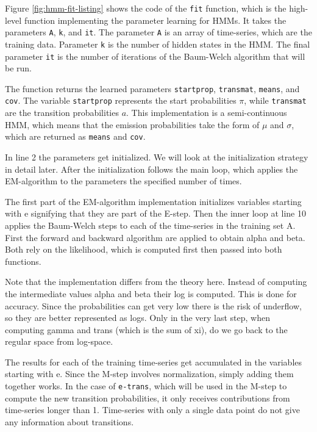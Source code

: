 Figure \ref{fig:hmm-fit-listing} shows the code of the \texttt{fit} function, which is the high-level function implementing the parameter learning for HMMs. It takes the parameters \texttt{A}, \texttt{k}, and \texttt{it}. The parameter \texttt{A} is an array of time-series, which are the training data. Parameter \texttt{k} is the number of hidden states in the HMM. The final parameter \texttt{it} is the number of iterations of the Baum-Welch algorithm that will be run. 

The function returns the learned parameters \texttt{startprop}, \texttt{transmat}, \texttt{means}, and \texttt{cov}. The variable \texttt{startprop} represents the start probabilities $\pi$, while \texttt{transmat} are the transition probabilities $a$. This implementation is a semi-continuous HMM, which means that the emission probabilities take the form of $\mu$ and $\sigma$, which are returned as \texttt{means} and \texttt{cov}.

In line 2 the parameters get initialized. We will look at the initialization strategy in detail later. After the initialization follows the main loop, which applies the EM-algorithm to the parameters the specified number of times. 

The first part of the EM-algorithm implementation initializes variables starting with e signifying that they are part of the E-step. Then the inner loop at line 10 applies the Baum-Welch steps to each of the time-series in the training set A. First the forward and backward algorithm are applied to obtain alpha and beta. Both rely on the likelihood, which is computed first then passed into both functions. 

Note that the implementation differs from the theory here. Instead of computing the intermediate values alpha and beta their log is computed. This is done for accuracy. Since the probabilities can get very low there is the risk of underflow, so they are better represented as logs. Only in the very last step, when computing gamma and trans (which is the sum of xi), do we go back to the regular space from log-space. 

The results for each of the training time-series get accumulated in the variables starting with e. Since the M-step involves normalization, simply adding them together works. In the case of \texttt{e-trans}, which will be used in the M-step to compute the new transition probabilities, it only receives contributions from time-series longer than 1. Time-series with only a single data point do not give any information about transitions.

